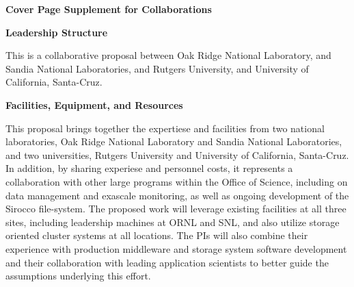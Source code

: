 \vfill
\begin{center}
\textbf{\huge Cover Page Supplement for Collaborations}
\end{center}

\vfill




\vfill
\begin{center}
\textbf{\large Leadership Structure}
\medskip
\end{center}


This is a collaborative proposal between 
Oak Ridge National Laboratory, and
Sandia National Laboratories, and
Rutgers University, and
University of California, Santa-Cruz.


\vfill
\begin{center}
\textbf{\large Facilities, Equipment, and Resources}
\medskip
\end{center}


This proposal brings together the expertiese and facilities from two
national laboratories, Oak Ridge National Laboratory and Sandia National
Laboratories, and two universities, Rutgers University and University of
California, Santa-Cruz. 
 In addition, by
sharing experiese and personnel costs, it represents
a collaboration with other large programs within the Office of
Science, including on data management and exascale monitoring, as well as
ongoing development of the Sirocco file-system. 
The proposed work will leverage existing facilities at all three
sites, including leadership machines at ORNL and SNL, and also utilize
storage oriented cluster systems at all locations. The PIs will also combine
their experience with production middleware and storage system software
development and their collaboration with leading application scientists to
better guide the assumptions underlying this effort. 

